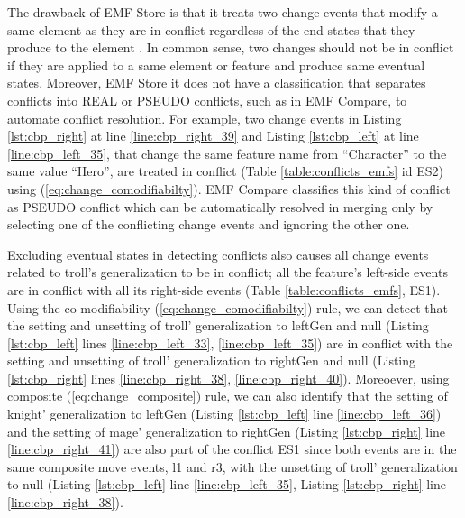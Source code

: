 The drawback of EMF Store is that it treats two change events that modify a same element as they are in conflict regardless of the end states that they produce to the element \cite{DBLP:conf/sfm/BroschKLSWW12}. In common sense, two changes should not be in conflict if they are applied to a same element or feature and produce same eventual states. Moreover, EMF Store it does not have a classification that separates conflicts into \textsf{REAL} or \textsf{PSEUDO} conflicts, such as in EMF Compare, to automate conflict resolution. For example, two change events in Listing \ref{lst:cbp_right} at line \ref{line:cbp_right_39} and Listing \ref{lst:cbp_left} at line \ref{line:cbp_left_35}, that change the same feature \textsf{name} from ``Character'' to the same value ``Hero'', are treated in conflict (Table \ref{table:conflicts_emfs} id ES2) using (\ref{eq:change_comodifiabilty}). EMF Compare classifies this kind of conflict as \textsf{PSEUDO} conflict which can be automatically resolved in merging only by selecting one of the conflicting change events and ignoring the other one.

Excluding eventual states in detecting conflicts also causes all change events related to \textsf{troll}'s \textsf{generalization} to be in conflict; all the feature's left-side events are in conflict with all its right-side events (Table \ref{table:conflicts_emfs}, ES1). Using the co-modifiability  (\ref{eq:change_comodifiabilty}) rule, we can detect that the setting and unsetting of \textsf{troll}' \textsf{generalization} to \textsf{leftGen} and \textsf{null} (Listing \ref{lst:cbp_left} lines \ref{line:cbp_left_33}, \ref{line:cbp_left_35}) are in conflict with the setting and unsetting of \textsf{troll}' \textsf{generalization} to \textsf{rightGen} and \textsf{null} (Listing \ref{lst:cbp_right} lines \ref{line:cbp_right_38}, \ref{line:cbp_right_40}). Moreoever, using composite (\ref{eq:change_composite}) rule, we can also identify that the setting of \textsf{knight}' \textsf{generalization} to \textsf{leftGen} (Listing \ref{lst:cbp_left} line \ref{line:cbp_left_36}) and the setting of \textsf{mage}' \textsf{generalization} to \textsf{rightGen} (Listing \ref{lst:cbp_right} line \ref{line:cbp_right_41}) are also part of the conflict ES1 since both events are in the same composite move events, \textsf{l1} and \textsf{r3}, with the unsetting of \textsf{troll}' \textsf{generalization} to  \textsf{null} (Listing \ref{lst:cbp_left} line \ref{line:cbp_left_35}, Listing \ref{lst:cbp_right} line \ref{line:cbp_right_38}).

